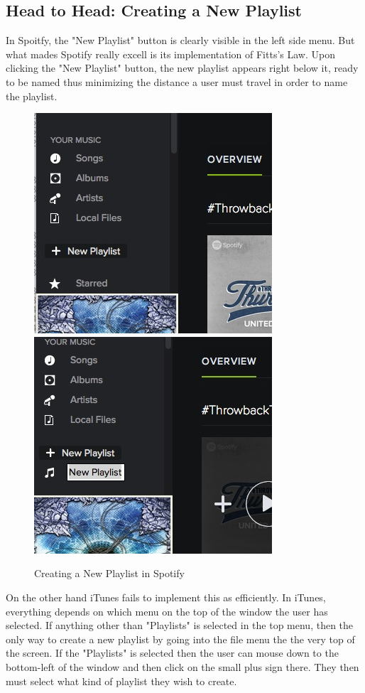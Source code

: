 \documentclass[a4paper]{article}
\begin{document}
\subsection{Head to Head: Creating a New Playlist}
In Spoitfy, the "New Playlist" button is clearly visible in the left side menu. But what mades Spotify really excell is its implementation of Fitts's Law. Upon clicking the "New Playlist" button, the new playlist appears right below it, ready to be named thus minimizing the distance a user must travel in order to name the playlist.
\begin{figure}[H]
\centering
\includegraphics[width=.3\textwidth]{spotifyplaylist1_copy.jpg}
\includegraphics[width=.3\textwidth]{spotifyplaylist2_copy.jpg}
\caption{\label{heuristic: playlistSpotify} Creating a New Playlist in Spotify}
\end{figure}
On the other hand iTunes fails to implement this as efficiently. In iTunes, everything depends on which menu on the top of the window the user has selected. If anything other than "Playlists" is selected in the top menu, then the only way to create a new playlist by going into the file menu the the very top of the screen. If the "Playlists" is selected then the user can mouse down to the bottom-left of the window and then click on the small plus sign there. They then must select what kind of playlist they wish to create.
\end{document}
